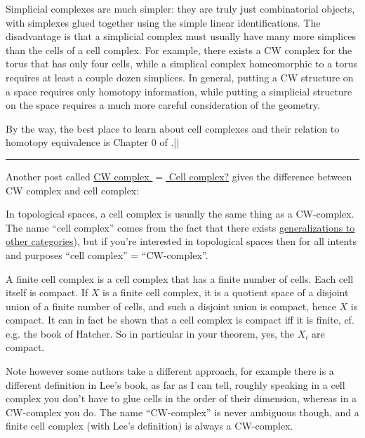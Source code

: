 Simplicial complexes are much simpler: they are truly just combinatorial objects, with simplexes glued together using the simple linear identifications.  The disadvantage is that a simplicial complex must usually have many more simplices than the cells of a cell complex.  For example, there exists a CW complex for the torus that has only four cells, while a simplical complex homeomorphic to a torus requires at least a couple dozen simplices.  In general, putting a CW structure on a space requires only homotopy information, while putting a simplicial structure on the space requires a much more careful consideration of the geometry.\par

By the way, the best place to learn about cell complexes and their relation to homotopy equivalence is Chapter 0 of \cite{hatcher}.\hfill ||

\vspace{3pt}
\hrule
\vspace{3pt}

Another post called \href{https://math.stackexchange.com/questions/1837569}{CW complex $=$ Cell complex?} gives the difference between CW complex and cell complex:

In topological spaces, a cell complex is usually the same thing as a CW-complex. The name ``cell complex'' comes from the fact that there exists \href{https://ncatlab.org/nlab/show/cell+complex}{generalizations to other categories}), but if you're interested in topological spaces then for all intents and purposes ``cell complex'' = ``CW-complex''.\par

A finite cell complex is a cell complex that has a finite number of cells. Each cell itself is compact. If $X$ is a finite cell complex, it is a quotient space of a disjoint union of a finite number of cells, and such a disjoint union is compact, hence $X$ is compact. It can in fact be shown that a cell complex is compact iff it is finite, cf. e.g. the book of Hatcher. So in particular in your theorem, yes, the $X_i$ are compact.\par

Note however some authors take a different approach, for example there is a different definition in Lee's book, as far as I can tell, roughly speaking in a cell complex you don't have to glue cells in the order of their dimension, whereas in a CW-complex you do. The name ``CW-complex'' is never ambiguous though, and a finite cell complex (with Lee's definition) is always a CW-complex.